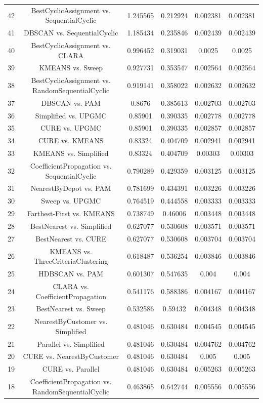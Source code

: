 \documentclass[a4paper,10pt]{article}
\begin{document}
\begin{landscape}
\begin{table}[!htp]
\begin{tabular}{cccccc}
42&BestCyclicAssignment vs. SequentialCyclic&1.245565&0.212924&0.002381&0.002381\\
41&DBSCAN vs. SequentialCyclic&1.185434&0.235846&0.002439&0.002439\\
40&BestCyclicAssignment vs. CLARA&0.996452&0.319031&0.0025&0.0025\\
39&KMEANS vs. Sweep&0.927731&0.353547&0.002564&0.002564\\
38&BestCyclicAssignment vs. RandomSequentialCyclic&0.919141&0.358022&0.002632&0.002632\\
37&DBSCAN vs. PAM&0.8676&0.385613&0.002703&0.002703\\
36&Simplified vs. UPGMC&0.85901&0.390335&0.002778&0.002778\\
35&CURE vs. UPGMC&0.85901&0.390335&0.002857&0.002857\\
34&CURE vs. KMEANS&0.83324&0.404709&0.002941&0.002941\\
33&KMEANS vs. Simplified&0.83324&0.404709&0.00303&0.00303\\
32&CoefficientPropagation vs. SequentialCyclic&0.790289&0.429359&0.003125&0.003125\\
31&NearestByDepot vs. PAM&0.781699&0.434391&0.003226&0.003226\\
30&Sweep vs. UPGMC&0.764519&0.444558&0.003333&0.003333\\
29&Farthest-First vs. KMEANS&0.738749&0.46006&0.003448&0.003448\\
28&BestNearest vs. Simplified&0.627077&0.530608&0.003571&0.003571\\
27&BestNearest vs. CURE&0.627077&0.530608&0.003704&0.003704\\
26&KMEANS vs. ThreeCriteriaClustering&0.618487&0.536254&0.003846&0.003846\\
25&HDBSCAN vs. PAM&0.601307&0.547635&0.004&0.004\\
24&CLARA vs. CoefficientPropagation&0.541176&0.588386&0.004167&0.004167\\
23&BestNearest vs. Sweep&0.532586&0.59432&0.004348&0.004348\\
22&NearestByCustomer vs. Simplified&0.481046&0.630484&0.004545&0.004545\\
21&Parallel vs. Simplified&0.481046&0.630484&0.004762&0.004762\\
20&CURE vs. NearestByCustomer&0.481046&0.630484&0.005&0.005\\
19&CURE vs. Parallel&0.481046&0.630484&0.005263&0.005263\\
18&CoefficientPropagation vs. RandomSequentialCyclic&0.463865&0.642744&0.005556&0.005556\\

\end{tabular}
\end{table}
\end{landscape}
\end{document}
